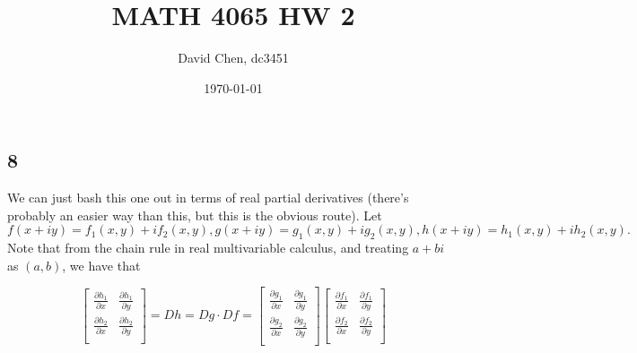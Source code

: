 \documentclass[12pt,letterpaper]{article}
\title{MATH 4065 HW 2}
\author{David Chen, dc3451}
\date{\today}
\theoremstyle{definition}
\begin{document}
\maketitle

\subsection*{8}

We can just bash this one out in terms of real partial derivatives (there's probably an easier way than this, but this is the obvious route). Let
\[
  f(x + iy) = f_{1}(x,y) + if_{2}(x,y), g(x + iy) = g_{1}(x,y) + ig_{2}(x,y), h(x + iy) = h_{1}(x,y) + ih_{2}(x,y).
\]
Note that from the chain rule in real multivariable calculus, and treating $a + bi$ as $(a,b)$, we have that

\[
  \begin{bmatrix}
    \frac{\partial h_{1}}{\partial x} & \frac{\partial h_{1}}{\partial y} \\
    \frac{\partial h_{2}}{\partial x} & \frac{\partial h_{2}}{\partial y} \\
  \end{bmatrix} =
  Dh = Dg \cdot Df =
  \begin{bmatrix}
    \frac{\partial g_{1}}{\partial x} & \frac{\partial g_{1}}{\partial y} \\
    \frac{\partial g_{2}}{\partial x} & \frac{\partial g_{2}}{\partial y} \\
  \end{bmatrix}
  \begin{bmatrix}
    \frac{\partial f_{1}}{\partial x} & \frac{\partial f_{1}}{\partial y} \\
    \frac{\partial f_{2}}{\partial x} & \frac{\partial f_{2}}{\partial y} \\
  \end{bmatrix}
\]
\end{document}
